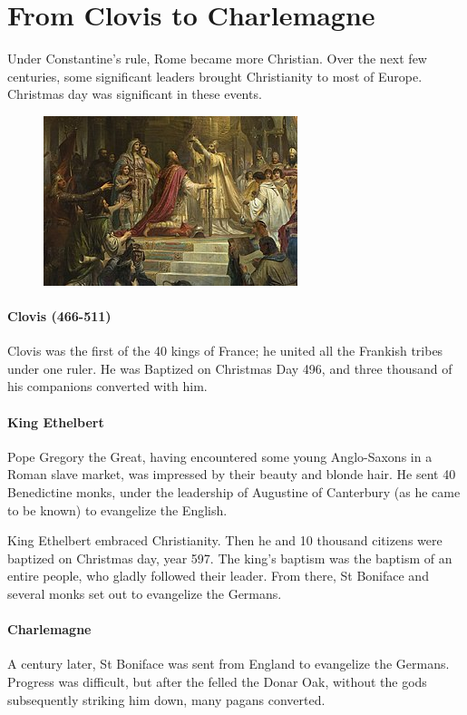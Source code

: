 \section{From Clovis to Charlemagne}

Under Constantine’s rule, Rome became more Christian. Over the next few centuries, some significant leaders brought Christianity to most of Europe. Christmas day was significant in these events.

\begin{figure}
\includegraphics[scale=.5]{a20191225FromClovistoCharlemagne-img001.jpg} 
\end{figure}

\paragraph{Clovis (466-511)}
Clovis was the first of the 40 kings of France; he united all the Frankish tribes under one ruler. He was Baptized on Christmas Day 496, and three thousand of his companions converted with him.

\paragraph{King Ethelbert}
Pope Gregory the Great, having encountered some young Anglo-Saxons in a Roman slave market, was impressed by their beauty and blonde hair. He sent 40 Benedictine monks, under the leadership of Augustine of Canterbury (as he came to be known) to evangelize the English.

King Ethelbert embraced Christianity. Then he and 10 thousand citizens were baptized on Christmas day, year 597. The king’s baptism was the baptism of an entire people, who gladly followed their leader. From there, St Boniface and several monks set out to evangelize the Germans.

\paragraph{Charlemagne}
A century later, St Boniface was sent from England to evangelize the Germans. Progress was difficult, but after the felled the Donar Oak, without the gods subsequently striking him down, many pagans converted.

